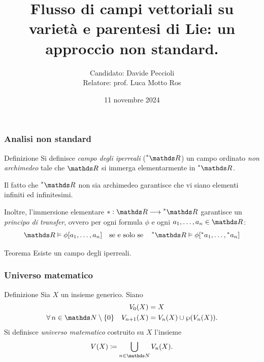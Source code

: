 \documentclass{beamer}
\title[Davide Peccioli]{Flusso di campi vettoriali su varietà e parentesi di Lie: un approccio non standard.}
\author[]{Candidato: Davide Peccioli\\ Relatore: prof. Luca Motto Ros}
\date{11 novembre 2024}
\newenvironment{definizioneb}{\begin{block}{Definizione}}{\end{block}}
\newenvironment{teoremab}{\begin{alertblock}{Teorema}}{\end{alertblock}}
\begin{document}
\begin{frame}
    \maketitle
\end{frame}



\begin{frame}
    \frametitle{Analisi non standard}

    \begin{definizioneb}
        Si definisce \emph{campo degli iperreali} ($\starR$) un campo ordinato \emph{non archimedeo} tale che $ \R $ si immerga elementarmente in $ \starR $.
    \end{definizioneb}

    Il fatto che $ \starR $ non sia archimedeo garantisce che vi siano elementi infiniti ed infinitesimi. 
    
    Inoltre, l'immersione elementare $ *: \R \longrightarrow \starR $ garantisce un \emph{principo di transfer}, ovvero per ogni formula $ \phi $ e ogni $ a_1,\dots,a_{n} \in \R $: \begin{equation*}
        \R\vDash \phi[a_1,\dots,a_{n} ]\quad\text{se e solo se}\quad \starR \vDash\phi[\nonstandard{a_1},\dots,\nonstandard{a_{n} }]
    \end{equation*}

    \begin{teoremab}
        Esiste un campo degli iperreali.
    \end{teoremab}

\end{frame}


\begin{frame}
    \frametitle{Universo matematico}

    \begin{definizioneb}
        Sia $ X $ un insieme generico. Siano \begin{align*}
            V_0(X) &= X\\
            \forall\, n \in \N\setminus\{0\} \quad V_{n+1}(X) &= V_{n}(X)\cup\parti{V_{n}(X) }.
        \end{align*}Si definisce \emph{universo matematico} costruito su $ X $ l'insieme \begin{equation*}
            V(X)\coloneqq \bigcup_{n \in \N} V_{n}(X). 
        \end{equation*}
    \end{definizioneb}

\end{frame}
\end{document}

